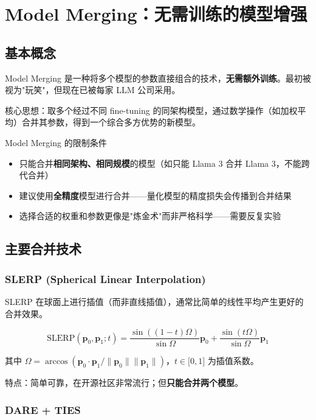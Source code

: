 \section{Model Merging：无需训练的模型增强}

\subsection{基本概念}

Model Merging 是一种将多个模型的参数直接组合的技术，\textbf{无需额外训练}。最初被视为"玩笑"，但现在已被每家 LLM 公司采用。

核心思想：取多个经过不同 fine-tuning 的同架构模型，通过数学操作（如加权平均）合并其参数，得到一个综合多方优势的新模型。

\begin{warningbox}{Model Merging 的限制条件}
\begin{itemize}
    \item 只能合并\textbf{相同架构、相同规模}的模型（如只能 Llama 3 合并 Llama 3，不能跨代合并）
    \item 建议使用\textbf{全精度}模型进行合并——量化模型的精度损失会传播到合并结果
    \item 选择合适的权重和参数更像是"炼金术"而非严格科学——需要反复实验
\end{itemize}
\end{warningbox}

\subsection{主要合并技术}

\subsubsection{SLERP (Spherical Linear Interpolation)}

SLERP 在球面上进行插值（而非直线插值），通常比简单的线性平均产生更好的合并效果。

$$\text{SLERP}(\mathbf{p}_0, \mathbf{p}_1; t) = \frac{\sin((1-t)\Omega)}{\sin\Omega}\mathbf{p}_0 + \frac{\sin(t\Omega)}{\sin\Omega}\mathbf{p}_1$$

其中 $\Omega = \arccos(\mathbf{p}_0 \cdot \mathbf{p}_1 / \|\mathbf{p}_0\| \|\mathbf{p}_1\|)$，$t \in {[}0, 1{]}$ 为插值系数。

特点：简单可靠，在开源社区非常流行；但\textbf{只能合并两个模型}。

\subsubsection{DARE + TIES}

